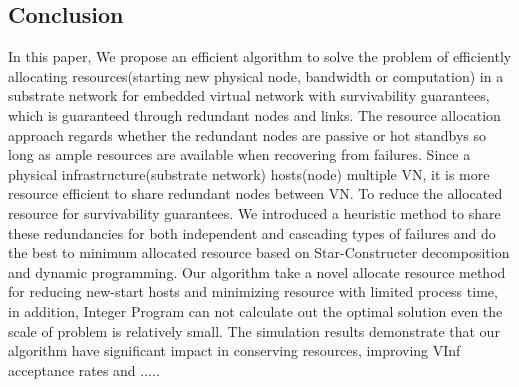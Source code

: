 \subsection{Conclusion}
In this paper, We propose an efficient algorithm to solve the problem of efficiently allocating resources(starting new physical node, bandwidth or computation) in a substrate network for embedded virtual network with survivability guarantees, which is guaranteed through redundant nodes and links. The resource allocation approach regards whether the redundant nodes are passive or hot standbys so long as ample resources are available when recovering from failures. Since a physical infrastructure(substrate network) hosts(node) multiple VN, it is
more resource efficient to share redundant nodes between VN. To reduce the allocated resource for survivability guarantees. We introduced a heuristic method to share these redundancies for both independent and cascading types
of failures and do the best to minimum allocated resource based on Star-Constructer decomposition and dynamic programming. Our algorithm take a novel allocate resource method for reducing new-start hosts and minimizing resource with limited process time, in addition, Integer Program can not calculate out the optimal solution even the scale of problem is relatively small. The simulation results demonstrate that our algorithm have significant impact in conserving resources, improving VInf acceptance rates and .....
